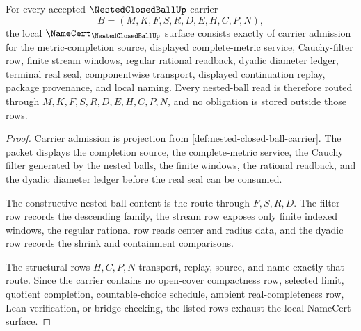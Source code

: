 \begin{theorem}
\label{thm:nested-closed-ball-namecert-obligations}
For every accepted $\NestedClosedBallUp$ carrier
$$
B=(M,K,F,S,R,D,E,H,C,P,N),
$$
the local $\NameCert_{\NestedClosedBallUp}$ surface consists exactly of carrier admission for the metric-completion source, displayed complete-metric service, Cauchy-filter row, finite stream windows, regular rational readback, dyadic diameter ledger, terminal real seal, componentwise transport, displayed continuation replay, package provenance, and local naming. Every nested-ball read is therefore routed through $M,K,F,S,R,D,E,H,C,P,N$, and no obligation is stored outside those rows.
\end{theorem}
\begin{proof}
Carrier admission is projection from \autoref{def:nested-closed-ball-carrier}. The packet displays the completion source, the complete-metric service, the Cauchy filter generated by the nested balls, the finite windows, the rational readback, and the dyadic diameter ledger before the real seal can be consumed.

The constructive nested-ball content is the route through $F,S,R,D$. The filter row records the descending family, the stream row exposes only finite indexed windows, the regular rational row reads center and radius data, and the dyadic row records the shrink and containment comparisons.

The structural rows $H,C,P,N$ transport, replay, source, and name exactly that route. Since the carrier contains no open-cover compactness row, selected limit, quotient completion, countable-choice schedule, ambient real-completeness row, Lean verification, or bridge checking, the listed rows exhaust the local NameCert surface.
\end{proof}

